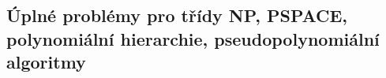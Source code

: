 \subsection{Úplné problémy pro třídy NP, PSPACE, polynomiální hierarchie, pseudopolynomiální algoritmy}